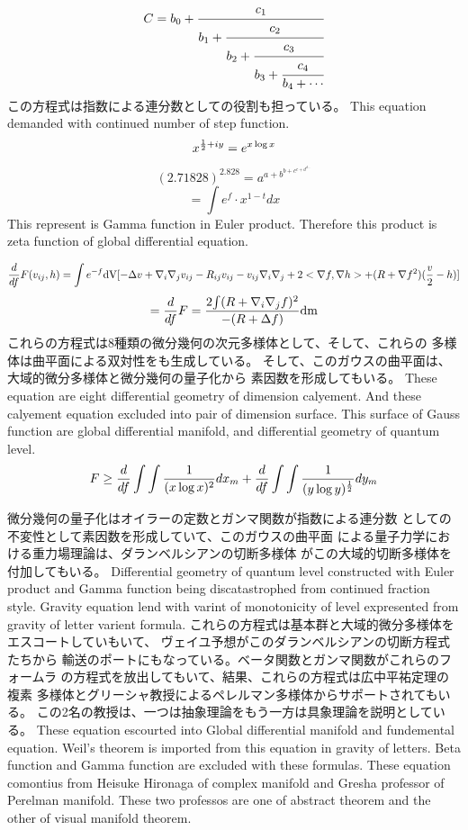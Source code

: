 \documentclass{jsarticle}
\begin{document}
{  $$ C =  b_0 + \cfrac{c_1}{b_1 +
	  \cfrac{c_2}{b_2 +
	  \cfrac{c_3}{b_3 +
	  \cfrac{c_4}{b_4 + \cdots}}}} $$
  この方程式は指数による連分数としての役割も担っている。  
  This equation demanded with continued number of step function.
  $$ x^{{1 \over 2} + iy} = e^{x \log x} $$
  $$ (2.71828)^{2.828} = a^{a + b^{b + c^{c + d^{d \cdots }}}} $$
  $$ = \int e^f \cdot x^{1 - t}dx $$
  This represent is Gamma function in Euler product.
  Therefore this product is zeta function of global differential equation.

  $$ {d \over d f}F(v_{ij},h) = \int {e^{-f}\mathrm{dV}}
  [- \Delta v + \nabla_{i}\nabla_{j}
  v_{ij} - R_{ij}v_{ij} - v_{ij}\nabla_{i}\nabla_{j} + 2 <\nabla f,\nabla h>
  + (R + \nabla f^2)({v \over 2} - h)]$$
  $$ = {d \over d f}F = {2 {\int (R + \nabla_{i}\nabla_{j} f)^2} \over 
  { - (R + \Delta f)}}\mathrm{dm} $$
  これらの方程式は8種類の微分幾何の次元多様体として、そして、これらの
  多様体は曲平面による双対性をも生成している。 
  そして、このガウスの曲平面は、大域的微分多様体と微分幾何の量子化から
  素因数を形成してもいる。
  These equation are eight differential geometry of dimension calyement.
  And these calyement equation excluded into pair of dimension surface.
  This surface of Gauss function are global differential manifold,
  and differential geometry of quantum level.
  $$ F \ge {d \over d f}\int \int{1 \over (x \log x)^2}dx_m 
  + {d \over d f}\int \int{1 \over (y \log y)^{1 \over 2}}dy_m $$

  微分幾何の量子化はオイラーの定数とガンマ関数が指数による連分数
  としての不変性として素因数を形成していて、このガウスの曲平面
  による量子力学における重力場理論は、ダランベルシアンの切断多様体
  がこの大域的切断多様体を付加してもいる。
  Differential geometry of quantum level constructed with Euler product
  and Gamma function being discatastrophed from continued fraction style.
  Gravity equation lend with varint of monotonicity of level expresented
  from gravity of letter varient formula.
  これらの方程式は基本群と大域的微分多様体をエスコートしていもいて、
  ヴェイユ予想がこのダランベルシアンの切断方程式たちから
  輸送のポートにもなっている。ベータ関数とガンマ関数がこれらのフォームラ
  の方程式を放出してもいて、結果、これらの方程式は広中平祐定理の複素
  多様体とグリーシャ教授によるペレルマン多様体からサポートされてもいる。
  この2名の教授は、一つは抽象理論をもう一方は具象理論を説明としている。
  These equation escourted into Global differential manifold and
  fundemental equation.
  Weil's theorem is imported from this equation in gravity of letters.
  Beta function and Gamma function are excluded with these formulas.
  These equation comontius from Heisuke Hironaga of complex manifold
  and Gresha professor of Perelman manifold.
  These two professos are one of abstract theorem and the other of
  visual manifold theorem.

}
\end{document}
